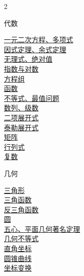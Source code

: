 \documentclass[12pt]{exam}
\begin{document}
\begin{multicols}{2}
\begin{center}
    {\Large 代数}
\end{center}
\hyperlink{一元二次方程、多项式}{一元二次方程、多项式} \dotfill \pageref{一元二次方程、多项式} \\
\hyperlink{因式定理、余式定理}{因式定理、余式定理} \dotfill \pageref{因式定理、余式定理} \\
\hyperlink{无理式、绝对值}{无理式、绝对值} \dotfill \pageref{无理式、绝对值} \\
\hyperlink{指数与对数}{指数与对数} \dotfill \pageref{指数与对数} \\
\hyperlink{方程组}{方程组} \dotfill \pageref{方程组} \\
\hyperlink{函数}{函数} \dotfill \pageref{函数} \\
\hyperlink{不等式、最值问题}{不等式、最值问题} \dotfill \pageref{不等式、最值问题} \\
\hyperlink{数列、级数}{数列、级数} \dotfill \pageref{数列、级数} \\
\hyperlink{二项展开式}{二项展开式} \dotfill \pageref{二项展开式} \\
\hyperlink{泰勒展开式}{泰勒展开式} \dotfill \pageref{泰勒展开式} \\
\hyperlink{矩阵}{矩阵} \dotfill \pageref{矩阵} \\
\hyperlink{行列式}{行列式} \dotfill \pageref{行列式} \\
\hyperlink{复数}{复数} \dotfill \pageref{复数}
\begin{center}
    {\Large 几何}
\end{center}
\hyperlink{三角形}{三角形} \dotfill \pageref{三角形} \\
\hyperlink{三角函数}{三角函数} \dotfill \pageref{三角函数} \\
\hyperlink{反三角函数}{反三角函数} \dotfill \pageref{反三角函数} \\
\hyperlink{圆}{圆} \dotfill \pageref{圆} \\
\hyperlink{五心、平面几何著名定理}{五心、平面几何著名定理} \dotfill \pageref{五心、平面几何著名定理} \\
\hyperlink{几何不等式}{几何不等式} \dotfill \pageref{几何不等式} \\
\hyperlink{直角坐标}{直角坐标} \dotfill \pageref{直角坐标} \\
\hyperlink{圆锥曲线}{圆锥曲线} \dotfill \pageref{圆锥曲线} \\
\hyperlink{坐标变换}{坐标变换} \dotfill \pageref{坐标变换} \\

\end{multicols}
\end{document}
